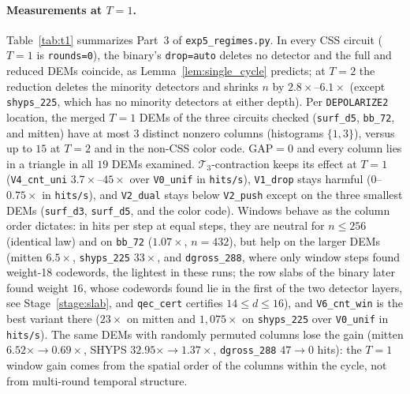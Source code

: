 \documentclass[12pt]{article}
\theoremstyle{definition}
\newcommand{\Tc}{\mathcal{T}_3}
\newcommand{\ttt}[1]{\texttt{#1}}
\begin{document}
\paragraph{Measurements at $T = 1$.}
Table~\ref{tab:t1} summarizes Part~3 of \ttt{exp5\_regimes.py}. In every CSS circuit ($T = 1$ is \ttt{rounds=0}),
the binary's \ttt{drop=auto} deletes no detector and the full and reduced DEMs coincide, as
Lemma~\ref{lem:single_cycle} predicts; at $T = 2$ the reduction deletes the minority detectors and shrinks $n$ by
$2.8\times$--$6.1\times$ (except \ttt{shyps\_225}, which has no minority detectors at either depth). Per
\ttt{DEPOLARIZE2} location, the merged $T = 1$ DEMs of the three circuits checked (\ttt{surf\_d5}, \ttt{bb\_72}, and
mitten) have at most $3$ distinct nonzero columns (histograms $\{1, 3\}$), versus up to $15$ at $T = 2$ and in the
non-CSS color code. $\mathrm{GAP} = 0$ and every column lies in a triangle in all $19$ DEMs examined. $\Tc$-contraction
keeps its effect at $T = 1$ (\ttt{V4\_cnt\_uni} $3.7\times$--$45\times$ over \ttt{V0\_unif} in \ttt{hits/s}),
\ttt{V1\_drop} stays harmful ($0$--$0.75\times$ in \ttt{hits/s}), and \ttt{V2\_dual} stays below \ttt{V2\_push} except
on the three smallest DEMs (\ttt{surf\_d3}, \ttt{surf\_d5}, and the color code). Windows behave as the column order
dictates: in hits per step at equal steps, they are neutral for $n \le 256$ (identical law) and on \ttt{bb\_72}
($1.07\times$, $n = 432$), but help on the larger DEMs (mitten $6.5\times$, \ttt{shyps\_225} $33\times$, and
\ttt{dgross\_288}, where only window steps found weight-18 codewords, the lightest in these runs; the row slabs of the
binary later found weight $16$, whose codewords found lie in the first of the two detector layers, see
Stage~\ref{stage:slab}, and \ttt{qec\_cert} certifies $14 \le d \le 16$), and \ttt{V6\_cnt\_win} is the best
variant there
($23\times$ on mitten and $1{,}075\times$ on \ttt{shyps\_225} over \ttt{V0\_unif} in \ttt{hits/s}). The same DEMs with
randomly permuted columns lose the gain (mitten $6.52\times \to 0.69\times$, SHYPS $32.95\times \to 1.37\times$,
\ttt{dgross\_288} $47 \to 0$ hits): the $T = 1$ window gain comes from the spatial order of the columns within the
cycle, not from multi-round temporal structure.
\end{document}
